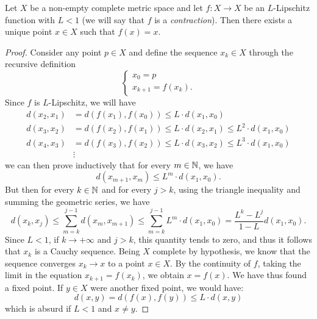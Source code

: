 \begin{theorem}
\mymark{***}%
%
%
%
%
%
%
%
\label{th:banach-caccioppoli}%
Let $X$ be a non-empty complete metric space and let $f\colon X \to X$ be an
$L$-Lipschitz function with $L<1$ (we will say that $f$ is a
\emph{contraction}).
Then there exists a unique point
$x\in X$ such that $f(x) = x$.
\end{theorem}
%
\begin{proof}
\mymark{***}
Consider any point $p \in X$ and define
the sequence $x_k\in X$ through the recursive definition
\[
\begin{cases}
  x_0 = p \\
  x_{k+1} = f(x_k).
\end{cases}
\]
Since $f$ is $L$-Lipschitz, we will have
\begin{align*}
  d(x_2, x_1) &= d(f(x_1),f(x_0)) \le L \cdot d(x_1,x_0) \\
  d(x_3, x_2) &= d(f(x_2),f(x_1)) \le L \cdot d(x_2,x_1)
  \le L^2 \cdot d(x_1, x_0) \\
  d(x_4, x_3) &= d(f(x_3),f(x_2)) \le L \cdot d(x_3,x_2)
  \le L^3 \cdot d(x_1, x_0) \\
  &\vdots
\end{align*}
we can then prove inductively that
for every $m\in {\mathbb N}$, we have
\[
  d(x_{m+1}, x_m) \le L^m \cdot d(x_1, x_0).
\]
But then for every $k\in {\mathbb N}$ and for every $j>k$,
using the triangle inequality and summing the geometric series,
we have
\[
  d(x_k,x_j) \le \sum_{m=k}^{j-1} d(x_m, x_{m+1})
   \le \sum_{m=k}^{j-1} L^m \cdot d(x_1, x_0)
   = \frac{L^k-L^j}{1-L} d(x_1,x_0).
\]
Since $L<1$, if $k\to +\infty$ and $j>k$, this quantity tends to zero, and thus
it follows that $x_k$ is a Cauchy sequence. Being $X$ complete by hypothesis, we
know that the sequence converges $x_k \to x$ to a point $x\in X$.
By the continuity of $f$, taking the limit in the equation
$x_{k+1} = f(x_k)$, we obtain $x = f(x)$.
We have thus found a fixed point.
If $y\in X$ were another fixed point, we would have:
\[
  d(x,y) = d(f(x),f(y)) \le L \cdot d(x,y)
\]
which is absurd if $L<1$ and $x\neq y$.
\end{proof}